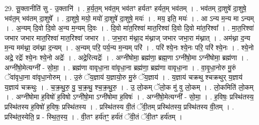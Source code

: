 \documentclass[17pt]{extarticle}
\begin{document}
29. सू॒क्तानीति॑ सु - उ॒क्तानि॑ । . ह॒र्य॒त॒म् भव॑त॒म् भव॑तꣳ हर्यतꣳ हर्यत॒म् भव॑तम् । . भव॑तम् दा॒शुषे॑ दा॒शुषे॒ भव॑त॒म् भव॑तम् दा॒शुषे᳚ । . दा॒शुषे॒ मयो॒ मयो॑ दा॒शुषे॑ दा॒शुषे॒ मयः॑ । . मय॒ इति॒ मयः॑ । . आ ऽन्य म॒न्य मा ऽन्यम् । . अ॒न्यम् दि॒वो दि॒वो अ॒न्य म॒न्यम् दि॒वः । . दि॒वो मा॑त॒रिश्वा॑ मात॒रिश्वा॑ दि॒वो दि॒वो मा॑त॒रिश्वा᳚ । . मा॒त॒रिश्वा॑ जभार जभार मात॒रिश्वा॑ मात॒रिश्वा॑ जभार । . ज॒भा॒रा म॑थ्ना॒द म॑थ्नाज् जभार जभा॒रा म॑थ्नात् । . अम॑थ्ना द॒न्य म॒न्य मम॑थ्ना॒ दम॑थ्ना द॒न्यम् । . अ॒न्यम् परि॒ पर्य॒न्य म॒न्यम् परि॑ । . परि॑ श्ये॒नः श्ये॒नः परि॒ परि॑ श्ये॒नः । . श्ये॒नो अद्रे॒ रद्रेः᳚ श्ये॒नः श्ये॒नो अद्रेः᳚ । . अद्रे॒रित्यद्रेः᳚ । . अग्नी॑षोमा॒ ब्रह्म॑णा॒ ब्रह्म॒णा ऽग्नी॑षो॒मा ऽग्नी॑षोमा॒ ब्रह्म॑णा । . अग्नी॑षो॒मेत्यग्नी᳚ - सो॒मा॒ । . ब्रह्म॑णा वावृधा॒ना वा॑वृधा॒ना ब्रह्म॑णा॒ ब्रह्म॑णा वावृधा॒ना । . वा॒वृ॒धा॒नोरु मु॒रुं ॅवा॑वृधा॒ना वा॑वृधा॒नोरुम् । . उ॒रुं ॅय॒ज्ञाय॑ य॒ज्ञायो॒रु मु॒रुं ॅय॒ज्ञाय॑ । . य॒ज्ञाय॑ चक्रथु श्चक्रथुर् य॒ज्ञाय॑ य॒ज्ञाय॑ चक्रथुः । . च॒क्र॒थु॒रु॒ वु॒ च॒क्र॒थु॒ श्च॒क्र॒थु॒रु॒ । . उ॒ लो॒कम् ॅलो॒क मु॑ वु लो॒कम् । . लो॒कमिति॑ लो॒कम् । . अग्नी॑षोमा ह॒विषो॑ ह॒विषो ऽग्नी॑षो॒मा ऽग्नी॑षोमा ह॒विषः॑ । . अग्नी॑षो॒मेत्यग्नी᳚ - सो॒मा॒ । . ह॒विषः॒ प्रस्थि॑तस्य॒ प्रस्थि॑तस्य ह॒विषो॑ ह॒विषः॒ प्रस्थि॑तस्य । . प्रस्थि॑तस्य वी॒तं ॅवी॒तम् प्रस्थि॑तस्य॒ प्रस्थि॑तस्य वी॒तम् । . प्रस्थि॑त॒स्येति॒ प्र - स्थि॒त॒स्य॒ । . वी॒तꣳ हर्य॑तꣳ॒॒ हर्य॑तं ॅवी॒तं ॅवी॒तꣳ हर्य॑तम् । \newline
\end{document}

